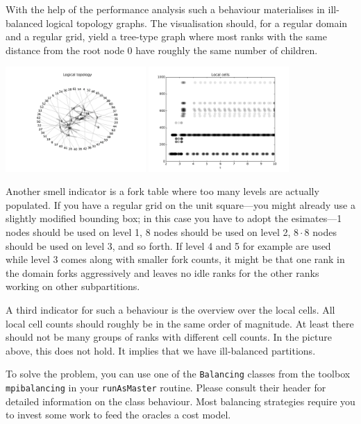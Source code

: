 \noindent
With the help of the performance analysis such a behaviour materialises in
ill-balanced logical topology graphs.
The visualisation should, for a regular domain and a regular grid, yield a
tree-type graph where most ranks with the same distance from the root node 0
have roughly the same number of children.

\begin{center} 
  \includegraphics[width=0.4\textwidth]{62_quick-tuning/topology.pdf}
  \includegraphics[width=0.4\textwidth]{62_quick-tuning/local-cells.pdf}
\end{center}

\noindent
Another smell indicator is a fork table where too many levels are actually
populated. 
If you have a regular grid on the unit square---you might already use a slightly
modified bounding box; in this case you have to adopt the esimates---1 nodes
should be used on level 1, 8 nodes should be used on level 2, $8 \cdot 8$ nodes
should be used on level 3, and so forth.
If level 4 and 5 for example are used while level 3 comes along with smaller
fork counts, it might be that one rank in the domain forks aggressively and
leaves no idle ranks for the other ranks working on other subpartitions.

A third indicator for such a behaviour is the overview over the local cells.
All local cell counts should roughly be in the same order of magnitude. 
At least there should not be many groups of ranks with different cell counts.
In the picture above, this does not hold.
It implies that we have ill-balanced partitions.

To solve the problem, you can use one of the \texttt{Balancing} classes from the
toolbox \texttt{mpibalancing} in your \texttt{runAsMaster} routine.
Please consult their header for detailed information on the class behaviour.
Most balancing strategies require you to invest some work to feed the
oracles a cost model.



